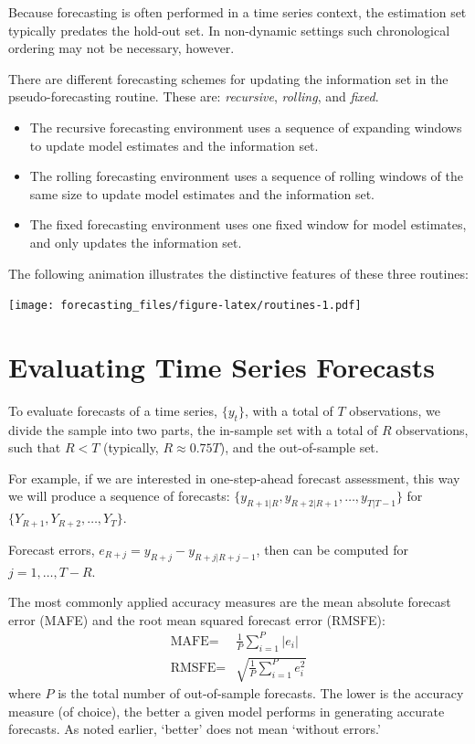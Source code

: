 \documentclass[
  12pt,
  oneside]{book}
\providecommand{\tightlist}{%
  \setlength{\itemsep}{0pt}\setlength{\parskip}{0pt}}
\begin{document}
Because forecasting is often performed in a time series context, the estimation set typically predates the hold-out set. In non-dynamic settings such chronological ordering may not be necessary, however.

There are different forecasting schemes for updating the information set in the pseudo-forecasting routine. These are: \emph{recursive}, \emph{rolling}, and \emph{fixed}.

\begin{itemize}
\tightlist
\item
  The recursive forecasting environment uses a sequence of expanding windows to update model estimates and the information set.
\item
  The rolling forecasting environment uses a sequence of rolling windows of the same size to update model estimates and the information set.
\item
  The fixed forecasting environment uses one fixed window for model estimates, and only updates the information set.
\end{itemize}

The following animation illustrates the distinctive features of these three routines:

\texttt{[image: forecasting\_files/figure-latex/routines-1.pdf]}

\hypertarget{evaluating-time-series-forecasts}{%
\section{Evaluating Time Series Forecasts}\label{evaluating-time-series-forecasts}}

To evaluate forecasts of a time series, \(\{y_t\}\), with a total of \(T\) observations, we divide the sample into two parts, the in-sample set with a total of \(R\) observations, such that \(R < T\) (typically, \(R \approx 0.75T\)), and the out-of-sample set.

For example, if we are interested in one-step-ahead forecast assessment, this way we will produce a sequence of forecasts: \(\{y_{R+1|R},y_{R+2|{R+1}},\ldots,y_{T|{T-1}}\}\) for \(\{Y_{R+1},Y_{R+2},\ldots,Y_{T}\}\).

Forecast errors, \(e_{R+j} = y_{R+j} - y_{R+j|{R+j-1}}\), then can be computed for \(j = 1,\ldots,T-R\).

The most commonly applied accuracy measures are the mean absolute forecast error (MAFE) and the root mean squared forecast error (RMSFE):
\[\begin{aligned}
\text{MAFE}  = & \frac{1}{P}\sum_{i=1}^{P}|e_i|\\
\text{RMSFE} = & \sqrt{\frac{1}{P}\sum_{i=1}^{P}e_i^2}
\end{aligned}\]
where \(P\) is the total number of out-of-sample forecasts. The lower is the accuracy measure (of choice), the better a given model performs in generating accurate forecasts. As noted earlier, `better' does not mean `without errors.'
\end{document}
